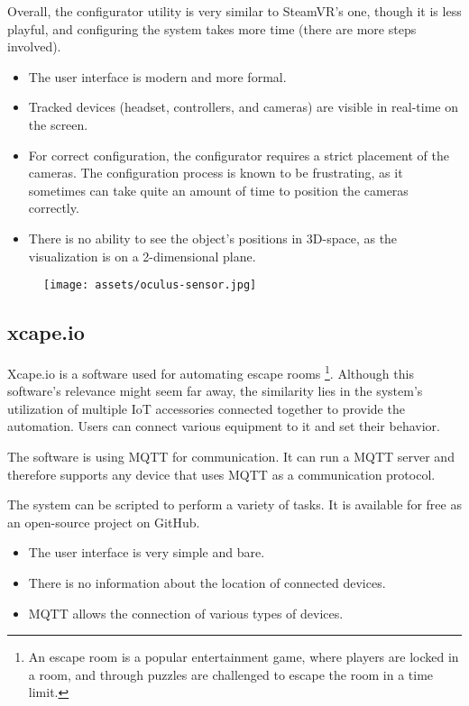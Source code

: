 Overall, the configurator utility is very similar to SteamVR’s one, though it
is less playful, and configuring the system takes more time (there are more steps
involved).


\begin{itemize}

\item The user interface is modern and more formal.

\item Tracked devices (headset, controllers, and cameras) are visible in real-time
on the screen.

\item For correct configuration, the configurator requires a strict placement
of the cameras. The configuration process is known to be frustrating,
as it sometimes can take quite an amount of time to position the cameras correctly.

\item There is no ability to see the object’s positions in 3D-space, as the visualization is
on a 2-dimensional plane.

\end{itemize}


\begin{figure}[h]{}
\centering\texttt{[image: assets/oculus-sensor.jpg]}
\caption{}

\end{figure}

\hypertarget{x-xcape.io}{\subsection{xcape.io}}
Xcape.io is a software used for automating escape rooms
\footnote{An escape room is a popular entertainment game, where players are locked in a room, and through puzzles are challenged to escape the room in a time limit.}.
Although this software’s relevance might seem far away,
the similarity lies in the system’s utilization of multiple IoT accessories
connected together to provide the automation. Users can connect various
equipment to it and set their behavior.


The software is using MQTT for communication. It can run a MQTT server and
therefore supports any device that uses MQTT as a communication protocol.


The system can be scripted to perform a variety of tasks. It is available
for free as an open-source project on GitHub.


\begin{itemize}

\item The user interface is very simple and bare.

\item There is no information about the location of connected devices.

\item MQTT allows the connection of various types of devices.

\end{itemize}
